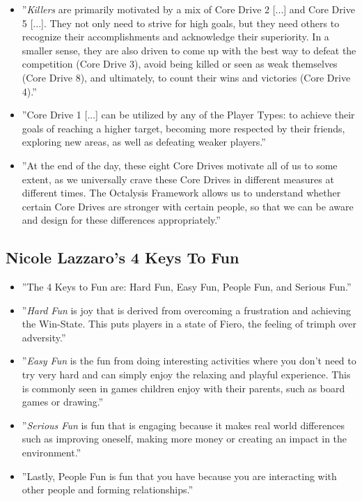\begin{itemize}
    \item ''\textit{Killers} are primarily motivated by a mix of Core Drive 2 [...] and Core Drive 5 [...]. They not only need to strive for high goals, but they need others to recognize their accomplishments and acknowledge their superiority. In a smaller sense, they are also driven to come up with the best way to defeat the competition (Core Drive 3), avoid being killed or seen as weak themselves (Core Drive 8), and ultimately, to count their wins and victories (Core Drive 4).''
    \item ''Core Drive 1 [...] can be utilized by any of the Player Types: to achieve their goals of reaching a higher target, becoming more respected by their friends, exploring new areas, as well as defeating weaker players.''
    \item ''At the end of the day, these eight Core Drives motivate all of us to some extent, as we universally crave these Core Drives in different measures at different times. The Octalysis Framework allows us to understand whether certain Core Drives are stronger with certain people, so that we can be aware and design for these differences appropriately.''
\end{itemize}

\subsection{Nicole Lazzaro's 4 Keys To Fun}
\begin{itemize}
    \item ''The 4 Keys to Fun are: Hard Fun, Easy Fun, People Fun, and Serious Fun.''
    \item ''\textit{Hard Fun} is joy that is derived from overcoming a frustration and achieving the Win-State. This puts players in a state of Fiero, the feeling of trimph over adversity.''
    \item ''\textit{Easy Fun} is the fun from doing interesting activities where you don't need to try very hard and can simply enjoy the relaxing and playful experience. This is commonly seen in games children enjoy with their parents, such as board games or drawing.''
    \item ''\textit{Serious Fun} is fun that is engaging because it makes real world differences such as improving oneself, making more money or creating an impact in the environment.''
    \item ''Lastly, People Fun is fun that you have because you are interacting with other people and forming relationships.''
\end{itemize}

